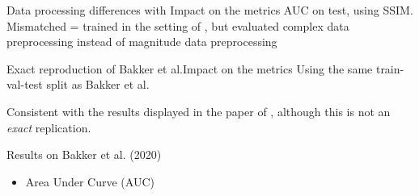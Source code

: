 \begin{frame}{Data processing differences with \cite{bakker2020experimental}}{Impact on the metrics}
    AUC on test, using SSIM.
    Mismatched = trained in the setting of \cite{bakker2020experimental}, but evaluated complex data preprocessing instead of magnitude data preprocessing
        \begin{center}
        \resizebox{\textwidth}{!}{} 
        \end{center}
\end{frame}

\begin{frame}{Exact reproduction of Bakker et al.}{Impact on the metrics}
Using the same train-val-test split as Bakker et al.
\begin{center}
    
\end{center}

Consistent with the results displayed in the paper of \cite{bakker2020experimental}, although this is not an \textit{exact} replication.
\end{frame}

\begin{frame}{Results on Bakker et al. (2020)}
        \begin{itemize}
            \item Area Under Curve (AUC)
        \end{itemize}
        \begin{center}
        \resizebox{0.75\linewidth}{!}{}%
        \end{center}
  \end{frame}

